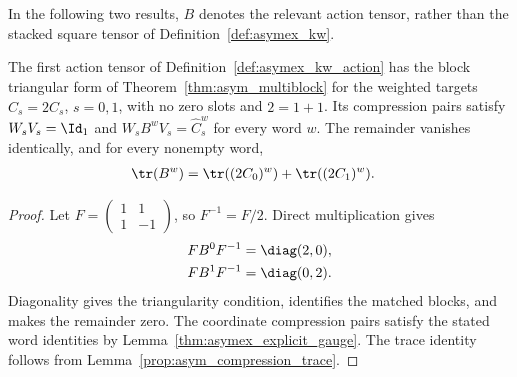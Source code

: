 In the following two results, $B$ denotes the relevant action tensor,
rather than the stacked square tensor of Definition~\ref{def:asymex_kw}.

\begin{lemma}
    \label{thm:asymex_kw_plus}
    \leanok
    The first action tensor of Definition~\ref{def:asymex_kw_action} has
    the block triangular form of Theorem~\ref{thm:asym_multiblock} for
    the weighted targets $\widehat C_s=2C_s$, $s=0,1$, with no zero
    slots and $2=1+1$. Its compression pairs satisfy $W_sV_s=\Id_1$
    and $W_sB^wV_s=\widehat C_s^w$ for every word $w$.
    The remainder vanishes identically, and for every nonempty word,
    \begin{align}
        \tr(B^w) & =\tr((2C_0)^w)+\tr((2C_1)^w).
        \notag
    \end{align}
\end{lemma}

\begin{proof}
    \leanok
    Let $F=\begin{pmatrix}1&1\\1&-1\end{pmatrix}$, so
    $F^{-1}=F/2$. Direct multiplication gives
    \begin{align}
        FB^0F^{-1} & =\diag(2,0),
        \notag                    \\
        FB^1F^{-1} & =\diag(0,2).
        \notag
    \end{align}
    Diagonality gives the triangularity condition, identifies the
    matched blocks, and makes the remainder zero. The coordinate
    compression pairs satisfy the stated word identities by
    Lemma~\ref{thm:asymex_explicit_gauge}. The trace identity follows
    from Lemma~\ref{prop:asym_compression_trace}.
\end{proof}

